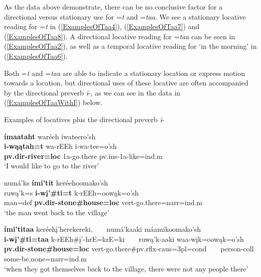 As the data above demonstrate, there can be no conclusive factor for a directional versus stationary use for =\textit{t} and =\textit{taa}. We see a stationary locative reading for =\textit{t} in (\ref{ExamplesOfTaa4}), (\ref{ExamplesOfTaa7}) and (\ref{ExamplesOfTaa8}). A directional locative reading for =\textit{taa} can be seen in (\ref{ExamplesOfTaa2}), as well as a temporal locative reading for `in the morning' in (\ref{ExamplesOfTaa6}).

Both =\textit{t} and =\textit{taa} are able to indicate a stationary location or express motion towards a location, but directional uses of these locative are often accompanied by the directional preverb \textit{i}-, as we can see in the data in (\ref{ExamplesOfTaaWithI}) below.

\begin{exe}

\item\label{ExamplesOfTaaWithI} Examples of locatives plus the directional preverb \textit{i}-

\begin{xlist}

\item\label{ExamplesOfTaaWithI1} \glll \textbf{ímaataht} waréeh íwateero'sh\\
    \textbf{i-wąątah=t} wa-rEEh i-wa-tee=o'sh\\
    \textbf{pv.dir-\textnormal{\bfseries river}=loc} 1a-\textnormal{go.there} pv.ins-1a-\textnormal{like}=ind.m\\
    \glt `I would like to go to the river' \citep[35]{hollow1973a}
    
\item\label{ExamplesOfTaaWithI2} \glll numá'ks \textbf{ími'tit} keréehoomako'sh\\
    ruwą'k=s \textbf{i-wį'\#ti=t} k-rEEh=oowąk=o'sh\\
    \textnormal{man}=def \textbf{pv.dir-\textnormal{\bfseries stone}\#\textnormal{house}=loc} vert-\textnormal{go.there}=narr=ind.m\\
    \glt `the man went back to the village' \citep[177]{hollow1973a}
    
\item\label{ExamplesOfTaaWithI3} \glll \textbf{ími'titaa} keréehį'herekereki, ~ ~   numá'kaaki máamikoomako'sh\\
    \textbf{i-wį'\#ti=taa} k-rEEh\#į'-hrE=krE=ki ~ ~   ruwą'k-aaki waa-wįk=oowąk=o'sh\\
    \textbf{pv.dir-\textnormal{\bfseries stone}\#\textnormal{\bfseries house}=loc} vert-\textnormal{go.there}\#pv.rflx-caus=3pl=cond ~ ~  \textnormal{person}-coll \textnormal{some}-\textnormal{be.none}=narr=ind.m\\
    \glt `when they got themselves back to the village, there were not any people there' \citep[182]{hollow1973a}


\end{xlist}
\end{exe}
